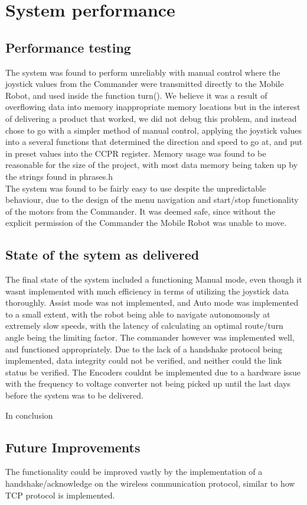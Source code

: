 


  \section{System performance}

    \label{sec:System performance}
  \subsection{Performance testing}
    The system was found to perform unreliably with manual control where the joystick values from the Commander were transmitted directly to the Mobile Robot, and used inside the function turn(). We believe it was a result of overflowing data into memory inappropriate memory locations but in the interest of delivering a product that worked, we did not debug this problem, and instead chose to go with a simpler method of manual control, applying the joystick values into a several functions that determined the direction and speed to go at, and put in preset values into the CCPR register. Memory usage was found to be reasonable for the size of the project, with most data memory being taken up by the strings found in phrases.h\\
    The system was found to be fairly easy to use despite the unpredictable behaviour, due to the design of the menu navigation and start/stop functionality of the motors from the Commander. It was deemed safe, since without the explicit permission of the Commander the Mobile Robot was unable to move.

    \label{sub:Performance testing}
  \subsection{State of the sytem as delivered}
    \label{sub:SystemState}
    The final state of the system included a functioning Manual mode, even though it wasnt implemented with much efficiency in terms of utilizing the joystick data thoroughly. Assist mode was not implemented, and Auto mode was implemented to a small extent, with the robot being able to navigate autonomously at extremely slow speeds, with the latency of calculating an optimal route/turn angle being the limiting factor. The commander however was implemented well, and functioned appropriately. Due to the lack of a handshake protocol being implemented, data integrity could not be verified, and neither could the link status be verified. The Encoders couldnt be implemented due to a hardware issue with the frequency to voltage converter not being picked up until the last days before the system was to be delivered.

    In conclusion

  \subsection{Future Improvements}
    \label{sub:Future Improvements}
    The functionality could be improved vastly by the implementation of a handshake/acknowledge on the wireless communication protocol, similar to how TCP protocol is implemented.





